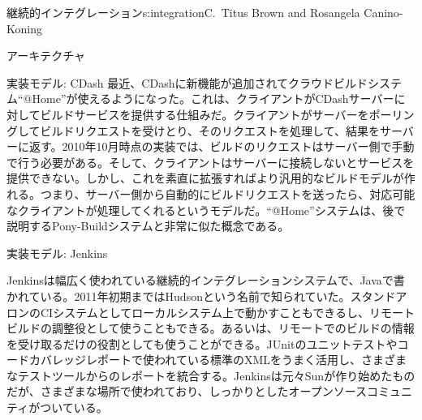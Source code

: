 \begin{aosachapter}{継続的インテグレーション}{s:integration}{C.\ Titus Brown and Rosangela Canino-Koning}
\begin{aosasect1}{アーキテクチャ}
\begin{aosasect2}{実装モデル: CDash}
最近、CDashに新機能が追加されてクラウドビルドシステム``@Home''が使えるようになった。これは、クライアントがCDashサーバーに対してビルドサービスを提供する仕組みだ。クライアントがサーバーをポーリングしてビルドリクエストを受けとり、そのリクエストを処理して、結果をサーバーに返す。2010年10月時点の実装では、ビルドのリクエストはサーバー側で手動で行う必要がある。そして、クライアントはサーバーに接続しないとサービスを提供できない。しかし、これを素直に拡張すればより汎用的なビルドモデルが作れる。つまり、サーバー側から自動的にビルドリクエストを送ったら、対応可能なクライアントが処理してくれるというモデルだ。``@Home''システムは、後で説明するPony-Buildシステムと非常に似た概念である。

\end{aosasect2}

\begin{aosasect2}{実装モデル: Jenkins}

Jenkinsは幅広く使われている継続的インテグレーションシステムで、Javaで書かれている。2011年初期まではHudsonという名前で知られていた。スタンドアロンのCIシステムとしてローカルシステム上で動かすこともできるし、リモートビルドの調整役として使うこともできる。あるいは、リモートでのビルドの情報を受け取るだけの役割としても使うことができる。JUnitのユニットテストやコードカバレッジレポートで使われている標準のXMLをうまく活用し、さまざまなテストツールからのレポートを統合する。Jenkinsは元々Sunが作り始めたものだが、さまざまな場所で使われており、しっかりとしたオープンソースコミュニティがついている。


\end{aosasect2}
\end{aosasect1}
\end{aosachapter}
